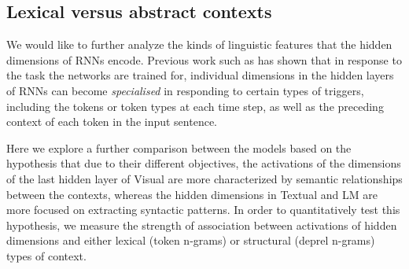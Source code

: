 %
%
%
%
\subsection{Lexical versus abstract contexts}
\label{seq:describe}

We would like to further analyze the kinds of linguistic features that the
hidden dimensions of RNNs encode. Previous work such as 
 has shown that in response 
to the task the networks are trained for, individual dimensions in the hidden layers of 
RNNs can become {\it specialised} in responding to certain types of triggers, including 
the tokens or token types at each time step, as well as the preceding context of
each token in the input sentence.

Here we explore a further comparison between the models based on the hypothesis 
that due to their different objectives, the activations of the dimensions of the last 
hidden layer of {\sc Visual} are more characterized by semantic relationships between 
the contexts, whereas the hidden dimensions in {\sc Textual} and {\sc LM} are 
more focused on extracting syntactic patterns. In order to quantitatively test this 
hypothesis, we measure the strength of association between activations of hidden 
dimensions and either lexical (token n-grams) or structural (deprel n-grams) types 
of context. 

